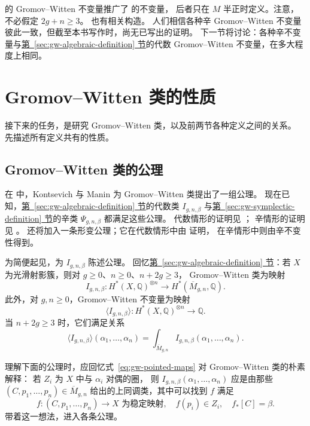  的 Gromov--Witten 不变量推广了  的不变量，
后者只在 $M$ 半正时定义。注意，不必假定 $2g+n\geq3$。
 也有相关构造。
人们相信各种辛 Gromov--Witten 不变量彼此一致，但截至本书写作时，尚无已写出的证明。
下一节将讨论：各种辛不变量与\hyperref[sec:gw-algebraic-definition]{第~\ref*{sec:gw-algebraic-definition} 节}的代数 Gromov--Witten 不变量，在多大程度上相同。

\section{Gromov--Witten 类的性质}\label{sec:gw-properties}
接下来的任务，是研究 Gromov--Witten 类，以及前两节各种定义之间的关系。
先描述所有定义共有的性质。

\subsection{Gromov--Witten 类的公理}\label{subsec:gw-axioms}
在  中，Kontsevich 与 Manin 为 Gromov--Witten 类提出了一组公理。
现在已知，\hyperref[sec:gw-algebraic-definition]{第~\ref*{sec:gw-algebraic-definition} 节}的代数类 $I_{g,n,\beta}$ 与\hyperref[sec:gw-symplectic-definition]{第~\ref*{sec:gw-symplectic-definition} 节}的辛类 $\Psi_{g,n,\beta}$ 都满足这些公理。
代数情形的证明见 ；
辛情形的证明见 。
还将加入一条形变公理；它在代数情形中由  证明，
在辛情形中则由辛不变性得到。

为简便起见，为 $I_{g,n,\beta}$ 陈述公理。
回忆\hyperref[sec:gw-algebraic-definition]{第~\ref*{sec:gw-algebraic-definition} 节}：若 $X$ 为光滑射影簇，则对 $g\geq0$、$n\geq0$、$n+2g\geq3$，
Gromov--Witten 类为映射
\[
I_{g,n,\beta}:H^*(X,\mathbb Q)^{\otimes n}
\longrightarrow H^*(\overline M_{g,n},\mathbb Q).
\]
此外，对 $g,n\geq0$，Gromov--Witten 不变量为映射
\[
\langle I_{g,n,\beta}\rangle:H^*(X,\mathbb Q)^{\otimes n}\longrightarrow\mathbb Q.
\]
当 $n+2g\geq3$ 时，它们满足关系
\[
\langle I_{g,n,\beta}\rangle(\alpha_1,\ldots,\alpha_n)
=\int_{\overline M_{g,n}}I_{g,n,\beta}(\alpha_1,\ldots,\alpha_n).
\]

理解下面的公理时，应回忆式~\eqref{eq:gw-pointed-maps} 对 Gromov--Witten 类的朴素解释：
若 $Z_i$ 为 $X$ 中与 $\alpha_i$ 对偶的圈，
则 $I_{g,n,\beta}(\alpha_1,\ldots,\alpha_n)$ 应是由那些
$(C,p_1,\ldots,p_n)\in\overline M_{g,n}$ 给出的上同调类，其中可以找到 $f$ 满足
\begin{equation}\label{eq:gw-axiom-naive-stable-map}
f:(C,p_1,\ldots,p_n)\longrightarrow X\text{ 为稳定映射},\quad
f(p_i)\in Z_i,\quad f_*[C]=\beta.
\end{equation}
带着这一想法，进入各条公理。

